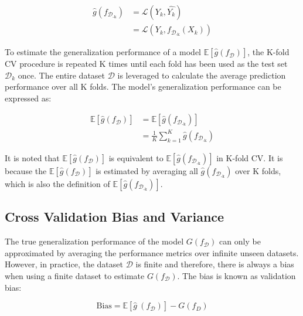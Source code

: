 \begin{equation} \label{eq_g_est}
    \begin{split}
\hat{g}(f_{\mathcal{D}_{\text{-k}}}) &= \mathcal{L}(Y_k, \hat{Y_k}) \\
    &= \mathcal{L}(Y_k, f_{\mathcal{D}_{\text{-k}}}(X_k))
    \end{split}
\end{equation}

To estimate the generalization performance of a model $\mathbb{E}[\hat{g}(f_\mathcal{D})]$, the K-fold CV procedure is repeated K times until each fold has been used as the test set $\mathcal{D}_k$ once. The entire dataset $\mathcal{D}$ is leveraged to calculate the average prediction performance over all K folds. The model's generalization performance can be expressed as:

\begin{equation} \label{eq_g_exp}
    \begin{split}
        \mathbb{E}[\hat{g}(f_{\mathcal{D}})] &= \mathbb{E}[\hat{g}(f_{\mathcal{D}_{\text{-k}}})] \\
        &= \frac{1}{K}\sum_{k=1}^{K} \hat{g}(f_{\mathcal{D}_{\text{-k}}})
    \end{split}
\end{equation}

It is noted that $\mathbb{E}[\hat{g}(f_\mathcal{D})]$ is equivalent to $\mathbb{E}[\hat{g}(f_{\mathcal{D}_{\text{-k}}})]$ in K-fold CV. It is because the $\mathbb{E}[\hat{g}(f_\mathcal{D})]$ is estimated by averaging all $\hat{g}(f_{\mathcal{D}_{\text{-k}}}) $ over K folds, which is also the definition of $\mathbb{E}[\hat{g}(f_{\mathcal{D}_{\text{-k}}})]$.

\subsection*{Cross Validation Bias and Variance}

The true generalization performance of the model $G(f_\mathcal{D})$ can only be approximated by averaging the performance metrics over infinite unseen datasets. However, in practice, the dataset $\mathcal{D}$ is finite and therefore, there is always a bias when using a finite dataset to estimate $G(f_\mathcal{D})$. The bias is known as validation bias:

\begin{equation} \label{eq_bias}
    \mathrm{Bias}=\mathbb{E}[\hat{g}\ (f_\mathcal{D})]-G(f_{D})
\end{equation}

